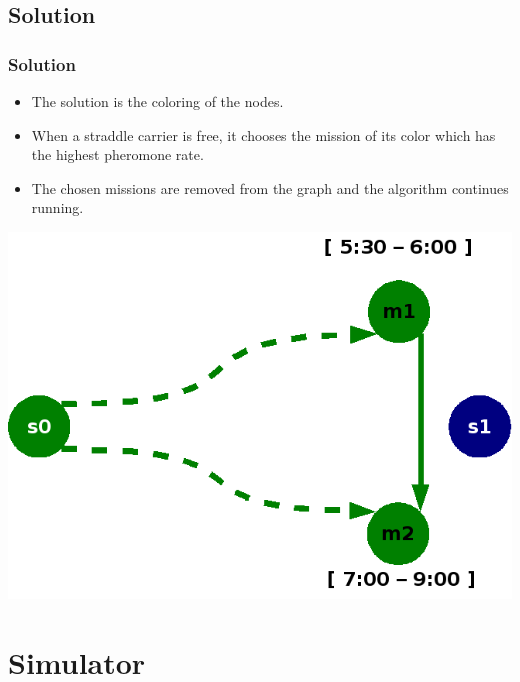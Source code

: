 \documentclass{beamer}
\begin{document}
\subsection*{Solution}
\begin{frame}
\frametitle{Solution}

	\begin{itemize}
	  \item The solution is the coloring of the nodes.
	  \item When a straddle carrier is free, it chooses the mission of its color which has the highest pheromone rate.
	  \item The chosen missions are removed from the graph and the algorithm continues running.
	\end{itemize}
	
	\begin{center}
		\includegraphics[height=.50\textheight]{fig/missionGraphWith2NodesRemoved.png}
	\end{center}
\end{frame}
\section{Simulator}
\end{document}
